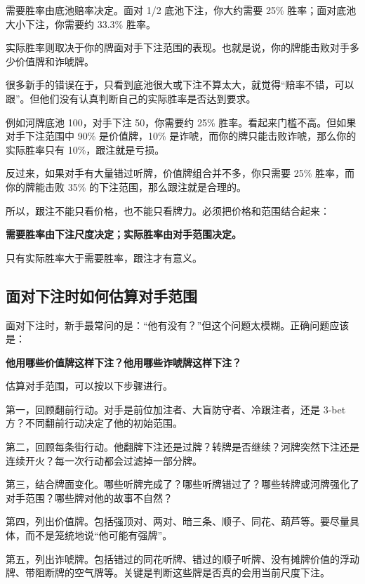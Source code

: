 需要胜率由底池赔率决定。面对 1/2 底池下注，你大约需要 25\% 胜率；面对底池大小下注，你需要约 33.3\% 胜率。

实际胜率则取决于你的牌面对手下注范围的表现。也就是说，你的牌能击败对手多少价值牌和诈唬牌。

很多新手的错误在于，只看到底池很大或下注不算太大，就觉得“赔率不错，可以跟”。但他们没有认真判断自己的实际胜率是否达到要求。

例如河牌底池 100，对手下注 50，你需要约 25\% 胜率。看起来门槛不高。但如果对手下注范围中 90\% 是价值牌，10\% 是诈唬，而你的牌只能击败诈唬，那么你的实际胜率只有 10\%，跟注就是亏损。

反过来，如果对手有大量错过听牌，价值牌组合并不多，你只需要 25\% 胜率，而你的牌能击败 35\% 的下注范围，那么跟注就是合理的。

所以，跟注不能只看价格，也不能只看牌力。必须把价格和范围结合起来：

\begin{center}
\textbf{需要胜率由下注尺度决定；实际胜率由对手范围决定。}
\end{center}

只有实际胜率大于需要胜率，跟注才有意义。

\subsection{面对下注时如何估算对手范围}

面对下注时，新手最常问的是：“他有没有？”但这个问题太模糊。正确问题应该是：

\begin{center}
\textbf{他用哪些价值牌这样下注？他用哪些诈唬牌这样下注？}
\end{center}

估算对手范围，可以按以下步骤进行。

第一，回顾翻前行动。对手是前位加注者、大盲防守者、冷跟注者，还是 3-bet 方？不同翻前行动决定了他的初始范围。

第二，回顾每条街行动。他翻牌下注还是过牌？转牌是否继续？河牌突然下注还是连续开火？每一次行动都会过滤掉一部分牌。

第三，结合牌面变化。哪些听牌完成了？哪些听牌错过了？哪些转牌或河牌强化了对手范围？哪些牌对他的故事不自然？

第四，列出价值牌。包括强顶对、两对、暗三条、顺子、同花、葫芦等。要尽量具体，而不是笼统地说“他可能有强牌”。

第五，列出诈唬牌。包括错过的同花听牌、错过的顺子听牌、没有摊牌价值的浮动牌、带阻断牌的空气牌等。关键是判断这些牌是否真的会用当前尺度下注。


